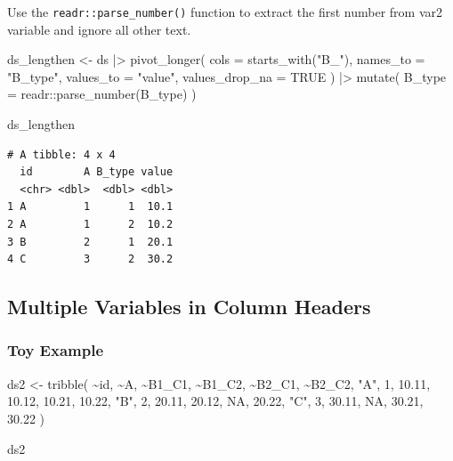 \documentclass[
  letterpaper,
  DIV=11,
  numbers=noendperiod]{scrreprt}
\newenvironment{Shaded}{\begin{snugshade}}{\end{snugshade}}
\newcommand{\AttributeTok}[1]{\textcolor[rgb]{0.40,0.45,0.13}{#1}}
\newcommand{\ConstantTok}[1]{\textcolor[rgb]{0.56,0.35,0.01}{#1}}
\newcommand{\DecValTok}[1]{\textcolor[rgb]{0.68,0.00,0.00}{#1}}
\newcommand{\FloatTok}[1]{\textcolor[rgb]{0.68,0.00,0.00}{#1}}
\newcommand{\FunctionTok}[1]{\textcolor[rgb]{0.28,0.35,0.67}{#1}}
\newcommand{\NormalTok}[1]{\textcolor[rgb]{0.00,0.23,0.31}{#1}}
\newcommand{\OtherTok}[1]{\textcolor[rgb]{0.00,0.23,0.31}{#1}}
\newcommand{\SpecialCharTok}[1]{\textcolor[rgb]{0.37,0.37,0.37}{#1}}
\newcommand{\StringTok}[1]{\textcolor[rgb]{0.13,0.47,0.30}{#1}}
\begin{document}
Use the \texttt{readr::parse\_number()} function to extract the first
number from var2 variable and ignore all other text.

\begin{Shaded}
\begin{Highlighting}[]
\NormalTok{ds\_lengthen }\OtherTok{\textless{}{-}}\NormalTok{ ds }\SpecialCharTok{|\textgreater{}} 
  \FunctionTok{pivot\_longer}\NormalTok{(}
    \AttributeTok{cols =} \FunctionTok{starts\_with}\NormalTok{(}\StringTok{"B\_"}\NormalTok{),}
    \AttributeTok{names\_to =} \StringTok{"B\_type"}\NormalTok{,}
    \AttributeTok{values\_to =} \StringTok{"value"}\NormalTok{,}
    \AttributeTok{values\_drop\_na =} \ConstantTok{TRUE}
\NormalTok{  ) }\SpecialCharTok{|\textgreater{}} 
  \FunctionTok{mutate}\NormalTok{(}
    \AttributeTok{B\_type =}\NormalTok{ readr}\SpecialCharTok{::}\FunctionTok{parse\_number}\NormalTok{(B\_type)}
\NormalTok{  )}

\NormalTok{ds\_lengthen}
\end{Highlighting}
\end{Shaded}

\begin{verbatim}
# A tibble: 4 x 4
  id        A B_type value
  <chr> <dbl>  <dbl> <dbl>
1 A         1      1  10.1
2 A         1      2  10.2
3 B         2      1  20.1
4 C         3      2  30.2
\end{verbatim}

\subsection{Multiple Variables in Column
Headers}\label{multiple-variables-in-column-headers}

\subsubsection{Toy Example}\label{toy-example-1}

\begin{Shaded}
\begin{Highlighting}[]
\NormalTok{ds2 }\OtherTok{\textless{}{-}} \FunctionTok{tribble}\NormalTok{(}
  \SpecialCharTok{\textasciitilde{}}\NormalTok{id, }\SpecialCharTok{\textasciitilde{}}\NormalTok{A, }\SpecialCharTok{\textasciitilde{}}\NormalTok{B1\_C1, }\SpecialCharTok{\textasciitilde{}}\NormalTok{B1\_C2, }\SpecialCharTok{\textasciitilde{}}\NormalTok{B2\_C1, }\SpecialCharTok{\textasciitilde{}}\NormalTok{B2\_C2,}
  \StringTok{"A"}\NormalTok{, }\DecValTok{1}\NormalTok{, }\FloatTok{10.11}\NormalTok{, }\FloatTok{10.12}\NormalTok{, }\FloatTok{10.21}\NormalTok{, }\FloatTok{10.22}\NormalTok{,}
  \StringTok{"B"}\NormalTok{, }\DecValTok{2}\NormalTok{, }\FloatTok{20.11}\NormalTok{, }\FloatTok{20.12}\NormalTok{, }\ConstantTok{NA}\NormalTok{, }\FloatTok{20.22}\NormalTok{,}
  \StringTok{"C"}\NormalTok{, }\DecValTok{3}\NormalTok{, }\FloatTok{30.11}\NormalTok{, }\ConstantTok{NA}\NormalTok{, }\FloatTok{30.21}\NormalTok{, }\FloatTok{30.22}
\NormalTok{)}

\NormalTok{ds2}
\end{Highlighting}
\end{Shaded}
\end{document}
